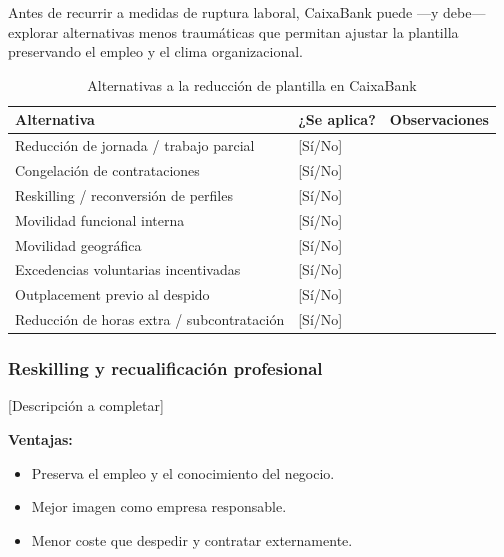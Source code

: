 Antes de recurrir a medidas de ruptura laboral, CaixaBank puede —y debe—
explorar alternativas menos traumáticas que permitan ajustar la plantilla
preservando el empleo y el clima organizacional.

\begin{table}[H]
  \centering
  \small
  \caption{Alternativas a la reducción de plantilla en CaixaBank}
  \begin{tabularx}{\textwidth}{p{} p{} X}
    \toprule
    \textbf{Alternativa}                        & \textbf{¿Se aplica?} & \textbf{Observaciones} \\
    \midrule
    Reducción de jornada / trabajo parcial       & [Sí/No] & \\
    Congelación de contrataciones                & [Sí/No] & \\
    Reskilling / reconversión de perfiles        & [Sí/No] & \\
    Movilidad funcional interna                  & [Sí/No] & \\
    Movilidad geográfica                         & [Sí/No] & \\
    Excedencias voluntarias incentivadas         & [Sí/No] & \\
    Outplacement previo al despido               & [Sí/No] & \\
    Reducción de horas extra / subcontratación   & [Sí/No] & \\
    \bottomrule
  \end{tabularx}
\end{table}

\subsubsection{Reskilling y recualificación profesional}


[Descripción a completar]

\textbf{Ventajas:}
\begin{itemize}
  \item Preserva el empleo y el conocimiento del negocio.
  \item Mejor imagen como empresa responsable.
  \item Menor coste que despedir y contratar externamente.
\end{itemize}

